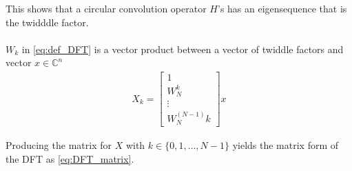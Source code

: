 This shows that a circular convolution operator $H$'s has an eigensequence that is the twidddle factor.
\\\\ 
$W_k$ in \eqref{eq:def_DFT} is a vector product between a vector of twiddle factors and vector $x \in \mathbb{C}^n$
\begin{align*}
	X_k =
	\begin{bmatrix}
		1 \\	W_N^k \\	\vdots \\ W_N^(N-1)k
	\end{bmatrix}
	x
\end{align*}

Producing the matrix for $X$ with $k \in \{0, 1, \dots, N-1\}$ yields the matrix form of the DFT as \eqref{eq:DFT_matrix}.

